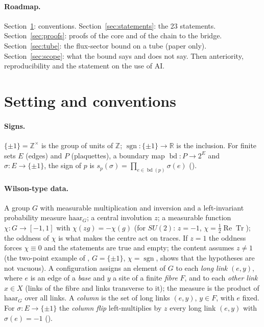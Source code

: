 \documentclass[11pt,a4paper]{article}
\theoremstyle{plain}
\theoremstyle{definition}
\theoremstyle{remark}
\numberwithin{equation}{section}
\newcommand{\R}{\mathbb{R}}
\newcommand{\Z}{\mathbb{Z}}
\newcommand{\Tr}{\operatorname{Tr}}
\newcommand{\lean}[1]{\texttt{\expandafter\leanbk\detokenize{#1}\relax}}
\def\leanbk#1{\ifx#1\relax\else\ifx#1.#1\allowbreak\else\ifx#1_#1\allowbreak\else#1\fi\fi\expandafter\leanbk\fi}
\begin{document}
\paragraph{Roadmap.} Section~\ref{sec:setting}: conventions. Section~\ref{sec:statements}: the 23 statements. Section~\ref{sec:proofs}: proofs of the core and of the chain to the bridge. Section~\ref{sec:tube}: the flux-sector bound on a tube (paper only). Section~\ref{sec:scope}: what the bound says and does not say. Then anteriority, reproducibility and the statement on the use of AI.

\section{Setting and conventions}\label{sec:setting}
\paragraph{Signs.} $\{\pm1\}=\mathbb Z^\times$ is the group of units of $\Z$; $\operatorname{sgn}:\{\pm1\}\to\R$ is the inclusion. For finite sets $E$ (edges) and $P$ (plaquettes), a boundary map $\operatorname{bd}:P\to2^E$ and $\sigma:E\to\{\pm1\}$, the sign of $p$ is $s_p(\sigma)=\prod_{e\in\operatorname{bd}(p)}\sigma(e)$ (\lean{plaq}).

\paragraph{Wilson-type data.} A group $G$ with measurable multiplication and inversion and a left-invariant probability measure $\mathrm{haar}_G$; a central involution $z$; a measurable function $\chi:G\to[-1,1]$ with $\chi(zg)=-\chi(g)$ (for $SU(2)$: $z=-1$, $\chi=\frac12\operatorname{Re}\Tr$); the oddness of $\chi$ is what makes the centre act on traces. If $z=1$ the oddness forces $\chi\equiv0$ and the statements are true and empty; the content assumes $z\ne1$ (the two-point example of \lean{sharp_one_edge}, $G=\{\pm1\}$, $\chi=\operatorname{sgn}$, shows that the hypotheses are not vacuous). A configuration assigns an element of $G$ to each \emph{long link} $(e,y)$, where $e$ is an edge of a \emph{base} and $y$ a site of a finite \emph{fibre} $F$, and to each \emph{other link} $x\in X$ (links of the fibre and links transverse to it); the measure is the product of $\mathrm{haar}_G$ over all links. A \emph{column} is the set of long links $(e,y)$, $y\in F$, with $e$ fixed. For $\sigma:E\to\{\pm1\}$ the \emph{column flip} left-multiplies by $z$ every long link $(e,y)$ with $\sigma(e)=-1$ (\lean{columnFlip}).
\end{document}
